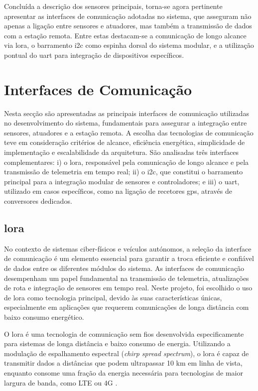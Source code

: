 Concluída a descrição dos sensores principais, torna-se agora pertinente apresentar as interfaces de comunicação adotadas no sistema, que asseguram não apenas a ligação entre sensores e atuadores, mas também a transmissão de dados com a estação remota. Entre estas destacam-se a comunicação de longo alcance via \gls{lora}, o barramento \gls{i2c} como espinha dorsal do sistema modular, e a utilização pontual do \gls{uart} para integração de dispositivos específicos.

\section{Interfaces de Comunicação}

Nesta secção são apresentadas as principais interfaces de comunicação utilizadas no desenvolvimento do sistema, fundamentais para assegurar a integração entre sensores, atuadores e a estação remota. A escolha das tecnologias de comunicação teve em consideração critérios de alcance, eficiência energética, simplicidade de implementação e escalabilidade da arquitetura. São analisadas três interfaces complementares: i) o \gls{lora}, responsável pela comunicação de longo alcance e pela transmissão de telemetria em tempo real; ii) o \gls{i2c}, que constitui o barramento principal para a integração modular de sensores e controladores; e iii) o \gls{uart}, utilizado em casos específicos, como na ligação de recetores \gls{gps}, através de conversores dedicados.  

\subsection{\acrfull{lora}}

No contexto de sistemas ciber-físicos e veículos autónomos, a seleção da interface de comunicação é um elemento essencial para garantir a troca eficiente e confiável de dados entre os diferentes módulos do sistema. As interfaces de comunicação desempenham um papel fundamental na transmissão de telemetria, atualizações de rota e integração de sensores em tempo real. Neste projeto, foi escolhido o uso de \gls{lora} como tecnologia principal, devido às suas características únicas, especialmente em aplicações que requerem comunicações de longa distância com baixo consumo energético.

O \gls{lora} é uma tecnologia de comunicação sem fios desenvolvida especificamente para sistemas de longa distância e baixo consumo de energia. Utilizando a modulação de espalhamento espectral (\emph{chirp spread spectrum}), o \gls{lora} é capaz de transmitir dados a distâncias que podem ultrapassar 10 km em linha de vista, enquanto consome uma fração da energia necessária para tecnologias de maior largura de banda, como LTE \cite{wikipedia-lte} ou 4G \cite{wikipedia-4g,bivocom-lte-vs-lora}.  


